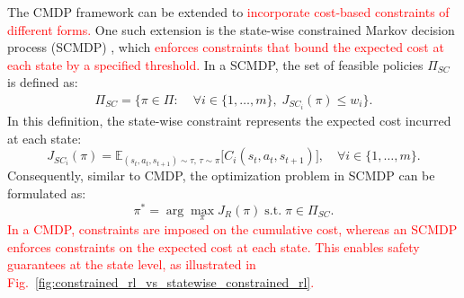 The CMDP framework can be extended to \textcolor{red}{incorporate cost-based constraints of different forms.}
One such extension is the state-wise constrained Markov decision process (SCMDP) \cite{zhao2023state}, which \textcolor{red}{enforces constraints that bound the expected cost at each state by a specified threshold.}
In a SCMDP, the set of feasible policies $\Pi_{SC}$ is defined as:
\begin{equation} \label{eq:feasible_policy_set_scmdp}
    \begin{aligned}    
        \Pi_{SC} = \{ \pi \in \Pi: &\;\forall i \in \{1, \ldots, m\}, \; J_{{SC}_i}(\pi) \leq w_i \}.
    \end{aligned}
\end{equation}
In this definition, the state-wise constraint represents the expected cost incurred at each state:
\begin{equation} \label{eq:statewise_cost_return}
    J_{{SC}_i}(\pi) = \mathbb{E}_{(s_t, a_t, s_{t + 1}) \sim \tau, \, \tau \sim \pi} \big[ C_i(s_t, a_t, s_{t + 1}) \big], 
    \quad \forall i \in \{1, \ldots, m\}.
\end{equation}
Consequently, similar to CMDP, the optimization problem in SCMDP can be formulated as:
\begin{equation} \label{eq:scmdp_optimization_problem}
    \pi^* = \arg\max_\pi J_R(\pi) \; \text{s.t.} \; \pi \in \Pi_{SC}.
\end{equation}  %
\textcolor{red}{In a CMDP, constraints are imposed on the cumulative cost, whereas an SCMDP enforces constraints on the expected cost at each state.}
\textcolor{red}{This enables safety guarantees at the state level, as illustrated in Fig.~\ref{fig:constrained_rl_vs_statewise_constrained_rl}.}
